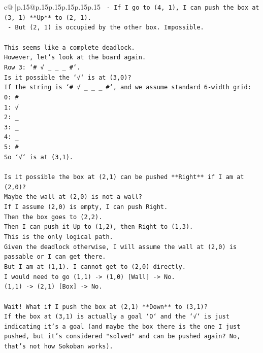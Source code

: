 \documentclass{article}
\begin{document}
{\begin{supertabular}{c@{$\;$}|p{.15\linewidth}@{}p{.15\linewidth}p{.15\linewidth}p{.15\linewidth}p{.15\linewidth}p{.15\linewidth}}
{{{\texttt{  {-} If I go to (4, 1), I can push the box at (3, 1) **Up** to (2, 1).} \\
\texttt{  {-} But (2, 1) is occupied by the other box. Impossible.} \\
\\ 
\texttt{This seems like a complete deadlock.} \\
\texttt{However, let's look at the board again.} \\
\texttt{Row 3: `\# √ \_ \_ \_ \#`.} \\
\texttt{Is it possible the `√` is at (3,0)?} \\
\texttt{If the string is `\# √ \_ \_ \_ \#`, and we assume standard 6{-}width grid:} \\
\texttt{0: \#} \\
\texttt{1: √} \\
\texttt{2: \_} \\
\texttt{3: \_} \\
\texttt{4: \_} \\
\texttt{5: \#} \\
\texttt{So `√` is at (3,1).} \\
\\ 
\texttt{Is it possible the box at (2,1) can be pushed **Right** if I am at (2,0)?} \\
\texttt{Maybe the wall at (2,0) is not a wall?} \\
\texttt{If I assume (2,0) is empty, I can push Right.} \\
\texttt{Then the box goes to (2,2).} \\
\texttt{Then I can push it Up to (1,2), then Right to (1,3).} \\
\texttt{This is the only logical path.} \\
\texttt{Given the deadlock otherwise, I will assume the wall at (2,0) is passable or I can get there.} \\
\texttt{But I am at (1,1). I cannot get to (2,0) directly.} \\
\texttt{I would need to go (1,1) {-}> (1,0) {[}Wall{]} {-}> No.} \\
\texttt{(1,1) {-}> (2,1) {[}Box{]} {-}> No.} \\
\\ 
\texttt{Wait! What if I push the box at (2,1) **Down** to (3,1)?} \\
\texttt{If the box at (3,1) is actually a goal `O` and the `√` is just indicating it's a goal (and maybe the box there is the one I just pushed, but it's considered "solved" and can be pushed again? No, that's not how Sokoban works).} \\
}}}
\end{supertabular}}
\end{document}
